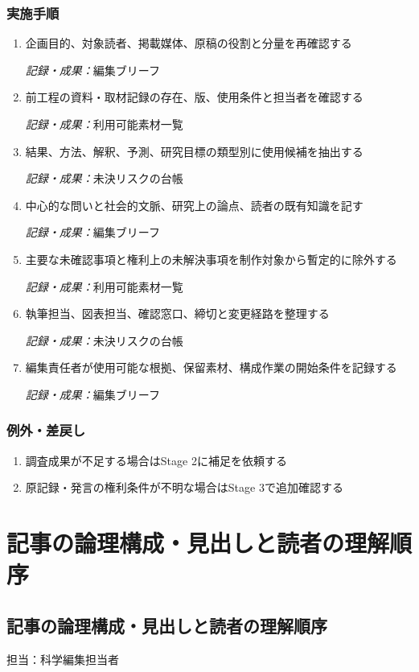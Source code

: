 \documentclass[a4paper,11pt]{article}
\begin{document}
\subsubsection*{実施手順}
\begin{enumerate}[leftmargin=2em,itemsep=0.65em]
\item 企画目的、対象読者、掲載媒体、原稿の役割と分量を再確認する\par\noindent\textit{記録・成果：}編集ブリーフ\nobreak\smallskip
\item 前工程の資料・取材記録の存在、版、使用条件と担当者を確認する\par\noindent\textit{記録・成果：}利用可能素材一覧\nobreak\smallskip
\item 結果、方法、解釈、予測、研究目標の類型別に使用候補を抽出する\par\noindent\textit{記録・成果：}未決リスクの台帳\nobreak\smallskip
\item 中心的な問いと社会的文脈、研究上の論点、読者の既有知識を記す\par\noindent\textit{記録・成果：}編集ブリーフ\nobreak\smallskip
\item 主要な未確認事項と権利上の未解決事項を制作対象から暫定的に除外する\par\noindent\textit{記録・成果：}利用可能素材一覧\nobreak\smallskip
\item 執筆担当、図表担当、確認窓口、締切と変更経路を整理する\par\noindent\textit{記録・成果：}未決リスクの台帳\nobreak\smallskip
\item 編集責任者が使用可能な根拠、保留素材、構成作業の開始条件を記録する\par\noindent\textit{記録・成果：}編集ブリーフ\nobreak\smallskip
\end{enumerate}
\subsubsection*{例外・差戻し}
\begin{enumerate}[leftmargin=2em,itemsep=0.35em]
\item 調査成果が不足する場合はStage 2に補足を依頼する
\item 原記録・発言の権利条件が不明な場合はStage 3で追加確認する
\end{enumerate}
\section{記事の論理構成・見出しと読者の理解順序}
\subsection{記事の論理構成・見出しと読者の理解順序}
\par 担当：科学編集担当者\par\medskip
\end{document}
